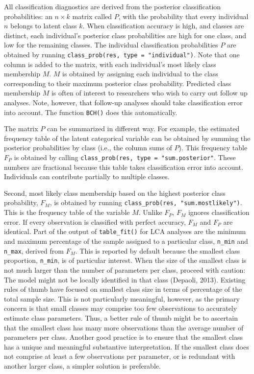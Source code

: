 \documentclass[
  ,man,floatsintext]{apa6}
\begin{document}
All classification diagnostics are derived from the posterior classification probabilities: an \(n \times k\) matrix called \(P\), with the probability that every individual \(n\) belongs to latent class \(k\).
When classification accuracy is high, and classes are distinct,
each individual's posterior class probabilities are high for one class, and low for the remaining classes.
The individual classification probabilities \(P\) are obtained by running \texttt{class\_prob(res,\ type\ =\ "individual")}.
Note that one column is added to the matrix, with each individual's most likely class membership \(M\).
\(M\) is obtained by assigning each individual to the class corresponding to their maximum posterior class probability.
Predicted class membership \(M\) is often of interest to researchers who wish to carry out follow up analyses.
Note, however, that follow-up analyses should take classification error into account.
The function \texttt{BCH()} does this automatically.

The matrix \(P\) can be summarized in different way.
For example, the estimated frequency table of the latent categorical variable can be obtained by summing the posterior probabilities by class (i.e., the column sums of \(P\)).
This frequency table \(F_P\) is obtained by calling \texttt{class\_prob(res,\ type\ =\ "sum.posterior"}.
These numbers are fractional because this table takes classification error into account.
Individuals can contribute partially to multiple classes.

Second, most likely class membership based on the highest posterior class probability, \(F_M\), is obtained by running \texttt{class\_prob(res,\ "sum.mostlikely")}.
This is the frequency table of the variable \(M\).
Unlike \(F_P\), \(F_M\) ignores classification error.
If every observation is classified with perfect accuracy,
\(F_M\) and \(F_P\) are identical.
Part of the output of \texttt{table\_fit()} for LCA analyses
are the minimum and maximum percentage of the sample assigned to a particular class, \texttt{n\_min} and \texttt{n\_max}, derived from \(F_M\).
This is reported by default because the smallest class proportion, \texttt{n\_min}, is of particular interest.
When the size of the smallest class is not much larger than the number of parameters per class,
proceed with caution:
The model might not be locally identified in that class (Depaoli, 2013).
Existing rules of thumb have focused on smallest class size in terms of percentage of the total sample size.
This is not particularly meaningful,
however, as the primary concern is that small classes may comprise too few observations to accurately estimate class parameters.
Thus, a better rule of thumb might be to ascertain that the smallest class has many more observations than the average number of parameters per class.
Another good practice is to ensure that the smallest class has a unique and meaningful substantive interpretation.
If the smallest class does not comprise at least a few observations per parameter, or is redundant with another larger class, a simpler solution is preferable.
\end{document}
